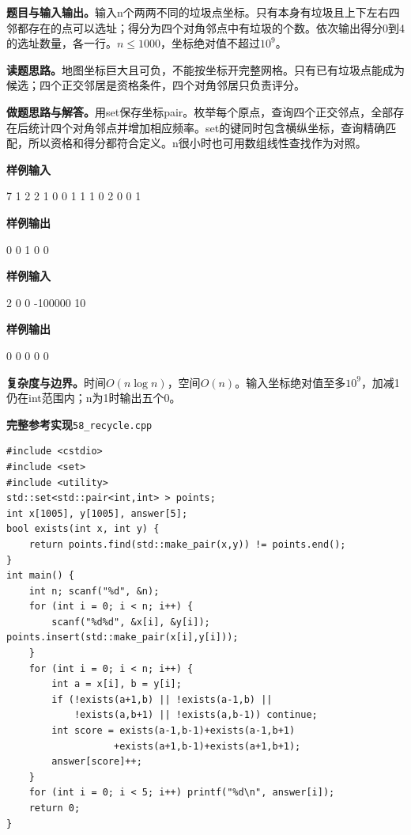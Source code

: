 \documentclass[UTF8,11pt,a4paper,fontset=none]{ctexart}
\begin{document}
\noindent\textbf{题目与输入输出。}输入n个两两不同的垃圾点坐标。只有本身有垃圾且上下左右四邻都存在的点可以选址；得分为四个对角邻点中有垃圾的个数。依次输出得分0到4的选址数量，各一行。$n\le1000$，坐标绝对值不超过$10^9$。

\noindent\textbf{读题思路。}地图坐标巨大且可负，不能按坐标开完整网格。只有已有垃圾点能成为候选；四个正交邻居是资格条件，四个对角邻居只负责评分。

\noindent\textbf{做题思路与解答。}用set保存坐标pair。枚举每个原点，查询四个正交邻点，全部存在后统计四个对角邻点并增加相应频率。set的键同时包含横纵坐标，查询精确匹配，所以资格和得分都符合定义。n很小时也可用数组线性查找作为对照。
\begin{tcolorbox}[samplebox,title={输入输出样例}]
\textbf{样例输入}
\begin{Sample}
7
1 2
2 1
0 0
1 1
1 0
2 0
0 1
\end{Sample}
\tcblower
\textbf{样例输出}
\begin{Sample}
0
0
1
0
0
\end{Sample}
\end{tcolorbox}
\begin{tcolorbox}[samplebox,title={输入输出样例}]
\textbf{样例输入}
\begin{Sample}
2
0 0
-100000 10
\end{Sample}
\tcblower
\textbf{样例输出}
\begin{Sample}
0
0
0
0
0
\end{Sample}
\end{tcolorbox}

\noindent\textbf{复杂度与边界。}时间$O(n\log n)$，空间$O(n)$。输入坐标绝对值至多$10^9$，加减1仍在int范围内；n为1时输出五个0。
\par\noindent\begin{minipage}{\linewidth}
\textbf{完整参考实现}\quad\texttt{58\_recycle.cpp}
\begin{lstlisting}
#include <cstdio>
#include <set>
#include <utility>
std::set<std::pair<int,int> > points;
int x[1005], y[1005], answer[5];
bool exists(int x, int y) {
    return points.find(std::make_pair(x,y)) != points.end();
}
int main() {
    int n; scanf("%d", &n);
    for (int i = 0; i < n; i++) {
        scanf("%d%d", &x[i], &y[i]); points.insert(std::make_pair(x[i],y[i]));
    }
    for (int i = 0; i < n; i++) {
        int a = x[i], b = y[i];
        if (!exists(a+1,b) || !exists(a-1,b) ||
            !exists(a,b+1) || !exists(a,b-1)) continue;
        int score = exists(a-1,b-1)+exists(a-1,b+1)
                   +exists(a+1,b-1)+exists(a+1,b+1);
        answer[score]++;
    }
    for (int i = 0; i < 5; i++) printf("%d\n", answer[i]);
    return 0;
}
\end{lstlisting}
\end{minipage}\par
\end{document}
